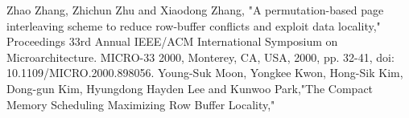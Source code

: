 
\begin{thebibliography}{99}
Zhao Zhang, Zhichun Zhu and Xiaodong Zhang, "A permutation-based page interleaving scheme to reduce row-buffer conflicts and exploit data locality," Proceedings 33rd Annual IEEE/ACM International Symposium on Microarchitecture. MICRO-33 2000, Monterey, CA, USA, 2000, pp. 32-41, doi: 10.1109/MICRO.2000.898056.
Young-Suk Moon, Yongkee Kwon, Hong-Sik Kim, Dong-gun Kim, Hyungdong Hayden Lee and Kunwoo Park,"The Compact Memory Scheduling Maximizing Row Buffer Locality,"
\end{thebibliography}